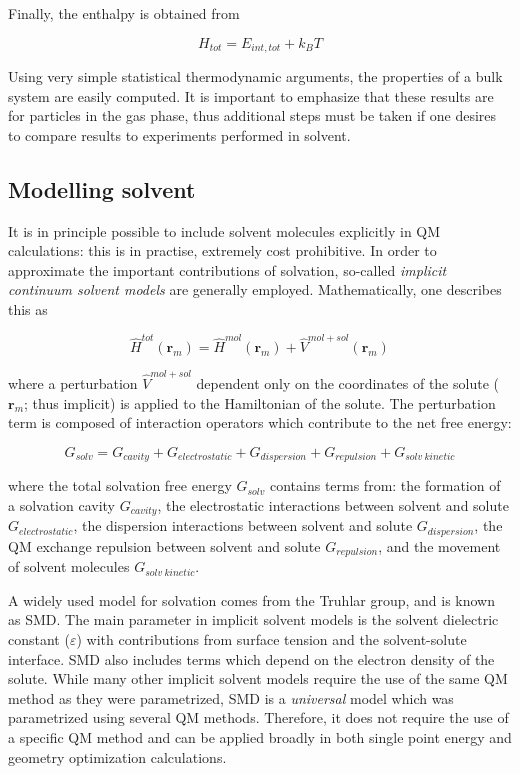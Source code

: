 \noindent Finally, the enthalpy is obtained from

\begin{equation}
  H_{tot} = E_{int,tot} + k_B T
\end{equation}

Using very simple statistical thermodynamic arguments, the properties of a bulk system are easily computed. It is important to emphasize that these results are for particles in the gas phase, thus additional steps must be taken if one desires to compare results to experiments performed in solvent.

\subsection{Modelling solvent}

It is in principle possible to include solvent molecules explicitly in QM calculations: this is in practise, extremely cost prohibitive. In order to approximate the important contributions of solvation, so-called \emph{implicit continuum solvent models} are generally employed.\cite{Mennucci2007,Cramer2004} Mathematically, one describes this as

\begin{equation}
  \hat{H}^{tot}(\mathbf{r}_m) = \hat{H}^{mol}(\mathbf{r}_m) + \hat{V}^{mol+sol}(\mathbf{r}_m)
\end{equation}

\noindent where a perturbation $\hat{V}^{mol+sol}$ dependent only on the coordinates of the solute ($\mathbf{r}_m$; thus implicit) is applied to the Hamiltonian of the solute. The perturbation term is composed of interaction operators which contribute to the net free energy:

\begin{equation}
G_{solv} = G_{cavity} + G_{electrostatic} + G_{dispersion} + G_{repulsion} +
G_{solv~kinetic}
\end{equation}

\noindent where the total solvation free energy $G_{solv}$ contains terms from: the formation of a solvation cavity $G_{cavity}$, the electrostatic interactions between solvent and solute $G_{electrostatic}$, the dispersion interactions between solvent and solute $G_{dispersion}$, the QM exchange repulsion between solvent and solute $G_{repulsion}$, and the movement of solvent molecules $G_{solv~kinetic}$.

A widely used model for solvation comes from the Truhlar group, and is known as SMD.\cite{Marenich2009} The main parameter in implicit solvent models is the solvent dielectric constant ($\varepsilon$) with contributions from surface tension and the solvent-solute interface. SMD also includes terms which depend on the electron density of the solute.  While many other implicit solvent models require the use of the same QM method as they were parametrized,\cite{Ho2010} SMD is a \emph{universal} model which was parametrized using several QM methods. Therefore, it does not require the use of a specific QM method and can be applied broadly in both single point energy and geometry optimization calculations.

